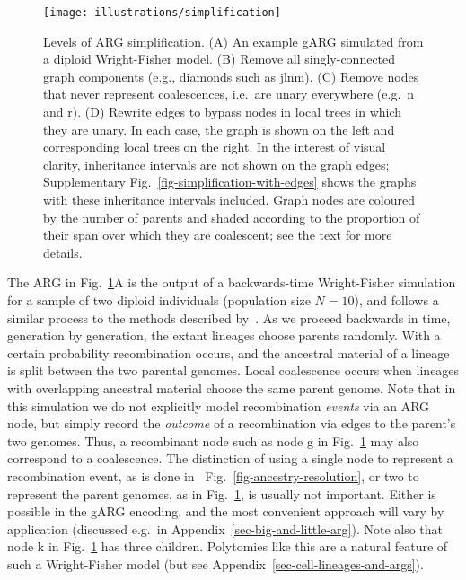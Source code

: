 \documentclass{article}
\newcommand{\noderef}[1]{\textsf{#1}}
\begin{document}
\begin{figure}
\centering
\texttt{[image: illustrations/simplification]}
\caption{\label{fig-simplification}
Levels of ARG simplification.
(A) An example gARG simulated from a diploid Wright-Fisher model.
(B) Remove all
singly-connected graph components (e.g., diamonds such as \noderef{jlnm}).
(C) Remove nodes that never represent coalescences,
i.e.\ are unary everywhere (e.g.\ \noderef{n} and \noderef{r}).
(D) Rewrite edges to bypass nodes in local trees in which they are unary.
In each case, the graph is shown on the left
and corresponding local trees on the right.
In the interest of visual clarity, inheritance intervals are not shown
on the graph edges; Supplementary Fig.~\ref{fig-simplification-with-edges}
shows the graphs with these inheritance intervals included.
Graph nodes are coloured by the number of parents and shaded
according to the proportion of their span over which they are coalescent;
see the text for more details.
}
\end{figure}

The ARG in Fig.~\ref{fig-simplification}A is the output of a
backwards-time Wright-Fisher simulation for a sample of two diploid
individuals (population size $N=10$), and follows a similar process
to the methods described by~\cite{nelson2020accounting}.
As we proceed backwards in time, generation by generation, the
extant lineages choose parents randomly.
With a certain probability recombination occurs, and the ancestral
material of a lineage is split between the two parental
genomes. Local coalescence occurs
when lineages with overlapping ancestral material choose the same
parent genome.
Note that in this simulation we do not explicitly
model recombination \emph{events} via an ARG node, but simply record
the \emph{outcome} of a recombination via edges to
the parent's two genomes.
Thus, a recombinant node such as node \noderef{g} in Fig.~\ref{fig-simplification}
may also correspond to a coalescence.
The distinction of
using a single node to represent
a recombination event, as is done in ~Fig.~\ref{fig-ancestry-resolution},
or two to represent the parent genomes, as in Fig.~\ref{fig-simplification},  is usually not important.
Either is possible in the gARG encoding, and the most convenient approach will vary by application
(discussed e.g.\ in Appendix~\ref{sec-big-and-little-arg}).
Note also that node \noderef{k} in Fig.~\ref{fig-simplification} has three children.
Polytomies like this are a natural feature of such a Wright-Fisher model
(but see Appendix~\ref{sec-cell-lineages-and-args}).
\end{document}
